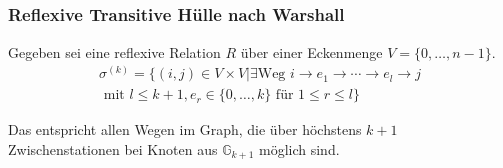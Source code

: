 \subsection*{}
\begin{frame}
	\frametitle{Reflexive Transitive Hülle nach Warshall}

	Gegeben sei eine reflexive Relation $R$ über einer Eckenmenge $V=\{0,\dots,n-1\}$.
	\begin{multline*}
		\sigma^{(k)} = \{(i,j)\in V \times V | \exists \text{Weg } i \to e_1 \to \cdots \to e_{l} \to j \\
		\text{ mit } l\le k+1, e_r\in\{0,\ldots,k\} \text{ für } 1\le r\le l\}
	\end{multline*}
	
	Das entspricht allen Wegen im Graph, die über höchstens $k+1$ {\glqq Zwischenstationen\grqq} bei Knoten aus $\mathbb{G}_{k+1}$ möglich sind.

	\begin{columns}
\end{columns}
\end{frame}
